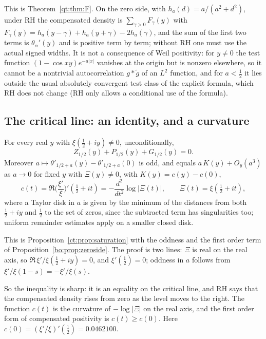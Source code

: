 This is Theorem~\ref{qt:thm:F}. On the zero side, with $h_a(d)=a/(a^2+d^2)$, under RH the compensated density is $\sum_{\gamma>0}F_\gamma(y)$ with $F_\gamma(y)=h_a(y-\gamma)+h_a(y+\gamma)-2h_a(\gamma)$, and the sum of the first two terms is $\theta_\alpha'(y)$ and is positive term by term; without RH one must use the actual signed widths. It is not a consequence of Weil positivity: for $y\ne0$ the test function $(1-\cos xy)e^{-a|x|}$ vanishes at the origin but is nonzero elsewhere, so it cannot be a nontrivial autocorrelation $g*\tilde g$ of an $L^2$ function, and for $a<\tfrac12$ it lies outside the usual absolutely convergent test class of the explicit formula, which RH does not change (RH only allows a conditional use of the formula).

\subsection{The critical line: an identity, and a curvature}

\begin{proposition}\label{qt:prop:boundary}
For every real $y$ with $\xi(\tfrac12+iy)\ne0$, unconditionally,
\[
Z_{1/2}(y)+P_{1/2}(y)+G_{1/2}(y)=0 .
\]
Moreover $a\mapsto\theta'_{1/2+a}(y)-\theta'_{1/2+a}(0)$ is odd, and equals $a\,K(y)+O_y(a^3)$ as $a\to0$ for fixed $y$ with $\Xi(y)\ne0$, with $K(y)=c(y)-c(0)$,
\[
c(t)=\Re\Big(\frac{\xi'}{\xi}\Big)'(\tfrac12+it)=-\frac{d^2}{dt^2}\log|\Xi(t)|,\qquad\Xi(t)=\xi(\tfrac12+it),
\]
where a Taylor disk in $a$ is given by the minimum of the distances from both $\tfrac12+iy$ and $\tfrac12$ to the set of zeros, since the subtracted term has singularities too; uniform remainder estimates apply on a smaller closed disk.
\end{proposition}

This is Proposition~\ref{ct:prop:saturation} with the oddness and the first order term of Proposition~\ref{bo:prop:zeroside}. The proof is two lines: $\Xi$ is real on the real axis, so $\Re\,\xi'/\xi(\tfrac12+iy)=0$, and $\xi'(\tfrac12)=0$; oddness in $a$ follows from $\xi'/\xi(1-s)=-\xi'/\xi(s)$.

So the inequality is sharp: it is an equality on the critical line, and RH says that the compensated density rises from zero as the level moves to the right. The function $c(t)$ is the curvature of $-\log|\Xi|$ on the real axis, and the first order form of compensated positivity is $c(t)\ge c(0)$. Here $c(0)=(\xi'/\xi)'(\tfrac12)=0.0462100$.

